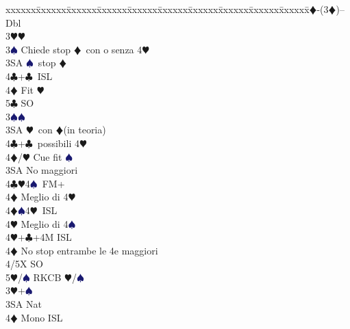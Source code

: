 \documentclass[a4paper,italian]{article}
\newcommand{\BC}{\textcolor{OliveGreen}{$\clubsuit$}}
\newcommand{\BD}{\textcolor{RedOrange}{$\vardiamondsuit$}}
\newcommand{\BH}{\textcolor{Red2}{$\varheartsuit${}}}
\newcommand{\BS}{\textcolor{MidnightBlue}{$\spadesuit${}}}
\newenvironment{bidtable}
{\begin{tabbing}

    xxxxxx\=xxxxxx\=xxxxxx\=xxxxxx\=xxxxxx\=xxxxxx\=xxxxxx\=xxxxxx\=xxxxxx\=xxxxxx\=\kill}
{\end{tabbing} }%
\begin{document}
\begin{multicols}{2}
                                        \begin{bidtable}
                                            2\BD-(3\BD)--\+\\
                                            Dbl\+\\
                                            3\BH {}\BH \+\\
                                            3\BS \> Chiede stop \BD\ con o senza 4\BH\\
                                            3SA \BS\ stop \BD\\
                                            4\BC {}+\BC\ ISL\\
                                            4\BD \> Fit \BH \\
                                            5\BC \> SO\-\\
                                            3\BS {}\BS \+\\
                                            3SA \BH\ con \BD (in teoria)\\
                                            4\BC {}+\BC\ possibili 4\BH\\
                                            4\BD/\BH \> Cue fit \BS \-\\
                                            3SA \> No maggiori\+\\
                                            4\BC {}\BH 4\BS\ FM+\+\\
                                            4\BD \> Meglio di 4\BH \-\\
                                            4\BD {}\BS 4\BH\ ISL\+\\
                                            4\BH \> Meglio di 4\BS \-\\
                                            4\BH {}+\BC +4M ISL\-\\
                                            4\BD\> No stop entrambe le 4e maggiori\+\\
                                            4/5X \> SO\\
                                            5\BH/\BS\> RKCB \BH/\BS\-\\
                                            3\BH {}+\BS \+\\
                                            3SA \> Nat\+\\
                                            4\BD \> Mono ISL\\

\end{bidtable}
\end{multicols}
\end{document}
